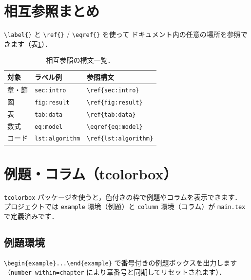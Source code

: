 \section{相互参照まとめ}

\verb|\label{}| と \verb|\ref{}| / \verb|\eqref{}| を使って
ドキュメント内の任意の場所を参照できます（表\ref{tab:smpl-ref}）．

\begin{table}[hbtp]
  \centering
  \caption{相互参照の構文一覧．}
  \label{tab:smpl-ref}
  \begin{tabular}{lll}
    \toprule
    対象   & ラベル例               & 参照構文 \\
    \midrule
    章・節 & \texttt{sec:intro}     & \verb|\ref{sec:intro}| \\
    図     & \texttt{fig:result}    & \verb|\ref{fig:result}| \\
    表     & \texttt{tab:data}      & \verb|\ref{tab:data}| \\
    数式   & \texttt{eq:model}      & \verb|\eqref{eq:model}| \\
    コード & \texttt{lst:algorithm} & \verb|\ref{lst:algorithm}| \\
    \bottomrule
  \end{tabular}
\end{table}

\section{例題・コラム（tcolorbox）}
\label{sec:tcolorbox}

\texttt{tcolorbox} パッケージを使うと，色付きの枠で例題やコラムを表示できます．
プロジェクトでは \texttt{example} 環境（例題）と \texttt{column} 環境（コラム）が
\texttt{main.tex} で定義済みです．

\subsection{例題環境}

\verb|\begin{example}...\end{example}| で番号付きの例題ボックスを出力します
（\texttt{number within=chapter} により章番号と同期してリセットされます）．


